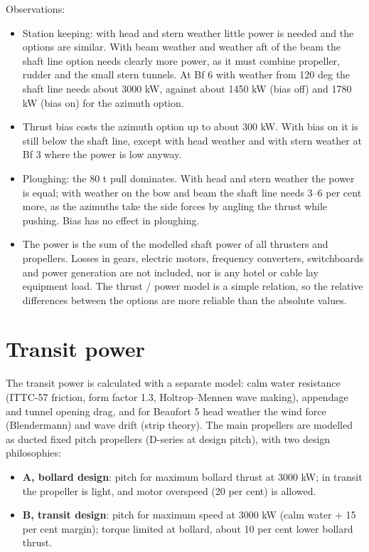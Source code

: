 \documentclass[a4paper,11pt]{article}
\begin{document}
Observations:
\begin{itemize}
\item Station keeping: with head and stern weather little power is needed and the options
are similar.  With beam weather and weather aft of the beam the shaft line option
needs clearly more power, as it must combine propeller, rudder and the small stern
tunnels.  At Bf 6 with weather from 120 deg the shaft line needs about 3000 kW,
against about 1450 kW (bias off) and 1780 kW (bias on) for the azimuth option.
\item Thrust bias costs the azimuth option up to about 300 kW.  With bias on it is still
below the shaft line, except with head weather and with stern weather at Bf 3 where
the power is low anyway.
\item Ploughing: the 80 t pull dominates.  With head and stern weather the power is equal;
with weather on the bow and beam the shaft line needs 3--6 per cent more, as the
azimuths take the side forces by angling the thrust while pushing.  Bias has no
effect in ploughing.
\item The power is the sum of the modelled shaft power of all thrusters and propellers.
Losses in gears, electric motors, frequency converters, switchboards and power
generation are not included, nor is any hotel or cable lay equipment load.  The
thrust / power model is a simple relation, so the relative differences between the
options are more reliable than the absolute values.
\end{itemize}

\section{Transit power}
\label{sec:org5b391f4}

The transit power is calculated with a separate model: calm water resistance
(ITTC-57 friction, form factor 1.3, Holtrop--Mennen wave making), appendage and
tunnel opening drag, and for Beaufort 5 head weather the wind force (Blendermann) and
wave drift (strip theory).
The main propellers are modelled as ducted fixed pitch propellers (D-series at design
pitch), with two design philosophies:

\begin{itemize}
\item \textbf{A, bollard design}: pitch for maximum bollard thrust at 3000 kW; in transit the
propeller is light, and motor overspeed (20 per cent) is allowed.
\item \textbf{B, transit design}: pitch for maximum speed at 3000 kW (calm water + 15 per cent
margin); torque limited at bollard, about 10 per cent lower bollard thrust.
\end{itemize}
\end{document}
